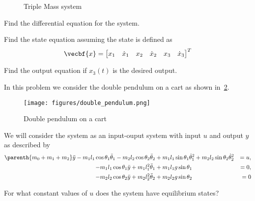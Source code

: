\begin{prob}
\begin{figure}[h]
    \caption{Triple Mass system~\label{fig:triple_mass}}
    \end{figure}

    \begin{subprob}
        \item Find the differential equation for the system.
        \item Find the state equation assuming the state is defined as
            \begin{align*}
                \vecbf{x} = \begin{bmatrix} x_1 & \dot{x}_1 & x_2 & \dot{x}_2 & x_3 & \dot{x}_3\end{bmatrix}^T
            \end{align*}

        \item Find the output equation if \( x_3(t)\) is the desired output.
    \end{subprob}
\end{prob}

\begin{prob}
    In this problem we consider the double pendulum on a cart as shown in~\cref{fig:double_pendulum}.
    \begin{figure}[h]
        \centering
        \texttt{[image: figures/double\_pendulum.png]}
        \caption{Double pendulum on a cart}
        \label{fig:double_pendulum}
    \end{figure}
    We will consider the system as an input-ouput system with input \( u \) and output \( y \) as described by
    \begin{align*}
        \parenth{m_0 + m_1 + m_2} \ddot y - m_1 l_1 \cos \theta_1 \ddot \theta_1 - m_2 l_2 \cos \theta_2 \ddot \theta_2 &+ m_1 l_1 \sin \theta_1 \dot \theta_1^2 + m_2 l_2 \sin \theta_2 \dot \theta_2^2 &= u , \\
        -m_1 l_1 \cos \theta_1 \ddot y + m_1 l_1^2 \ddot \theta_1 &+ m_1 l_1 g \sin \theta_1 &= 0 , \\
        - m_2 l_2 \cos \theta_2 \ddot y + m_2 l_2 ^2 \ddot \theta_2 &+ m_2 l_2 g \sin \theta_2 &= 0
    \end{align*}
    \begin{subprob}
    \item For what constant values of \( u \) does the system have equilibrium states?
    \end{subprob}
\end{prob}
